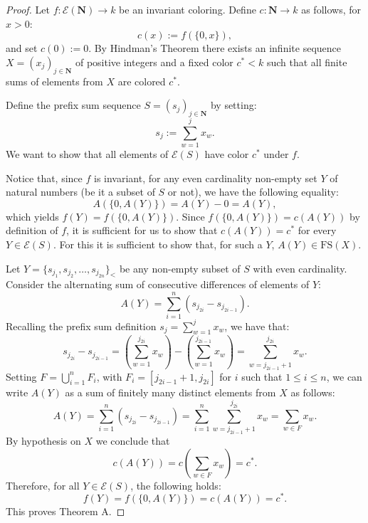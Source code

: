 \documentclass[10pt,a4paper]{amsart}
\newcommand{\Nat}{\mathbf{N}}
\newcommand{\FS}{\mathrm{FS}}
\theoremstyle{definition}
\begin{document}
\begin{proof}

    Let $f: \mathcal{E}(\Nat) \to k$ be an invariant coloring. Define $c: \Nat \to k$ as follows, for $x >0$:
    $$c(x) := f(\{0, x\}),$$
 and set $c(0):=0$. By Hindman's Theorem there exists an infinite sequence $X = (x_j)_{j \in \Nat}$ of positive integers and a fixed color $c^* < k$ such that all finite sums of elements from $X$ are colored $c^*$. 


Define the prefix sum sequence $S = (s_j)_{j \in \Nat}$ by setting:
    $$s_j := \sum_{w=1}^j x_w.$$
We want to show that all elements of $\mathcal{E}(S)$ have color $c^*$ under $f$.
  
Notice that, since $f$ is invariant, for any even cardinality non-empty set $Y$ of natural numbers (be it a subset of $S$ or not), we have the following equality: 
$$A(\{0, A(Y)\})=A(Y)-0=A(Y),$$ 
which yields $f(Y)=f(\{0, A(Y)\})$. Since $f(\{0, A(Y)\})=c(A(Y))$ by definition of $f$, it is sufficient for us to show that 
$c(A(Y))=c^*$ for every $Y \in \mathcal{E}(S)$. For this it is sufficient to show that, for such a $Y$, $A(Y) \in \FS(X)$. 

Let $Y = \{s_{j_1}, s_{j_2}, \dots, s_{j_{2n}}\}_<$ be any non-empty subset of $S$ with even cardinality. Consider the alternating sum of consecutive differences of elements of $Y$:
$$A(Y) = \sum_{i=1}^n (s_{j_{2i}} - s_{j_{2i-1}}).$$
    Recalling the prefix sum definition $s_j = \sum_{w=1}^j x_w$, we have that:
    $$s_{j_{2i}} - s_{j_{2i-1}} = \left(\sum_{w=1}^{j_{2i}} x_w\right) - \left(\sum_{w=1}^{j_{2i-1}} x_w\right) = \sum_{w=j_{2i-1}+1}^{j_{2i}} x_w.$$
Setting $F = \bigcup_{i=1}^n F_i$, with $F_i=[j_{2i-1}+1, j_{2i}]$ for $i$ such that $1\leq i \leq n$, we can write $A(Y)$ as a sum of finitely many distinct elements from $X$ as follows:
    $$A(Y)=\sum_{i=1}^{n}(s_{j_{2i}}-s_{j_{2i-1}})=\sum_{i=1}^{n}\sum_{w=j_{2i-1}+1}^{j_{2i}}x_w=\sum_{w \in F} x_w.$$
By hypothesis on $X$ we conclude that
    $$c(A(Y))=c\left(\sum_{w \in F} x_w\right) = c^*.$$
Therefore, for all $Y \in \mathcal{E}(S)$, the following holds:
    $$f(Y)=f(\{0, A(Y)\})=c(A(Y)) = c^*.$$
This proves Theorem A.
\end{proof}
\end{document}
